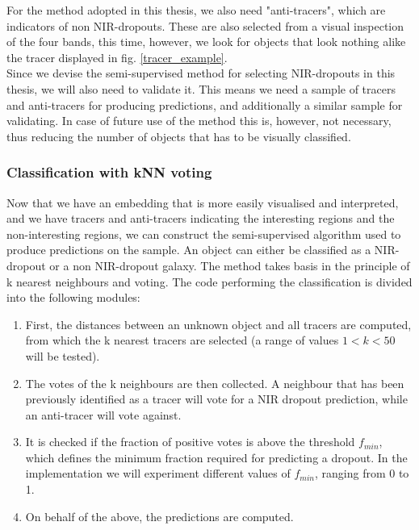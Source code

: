 For the method adopted in this thesis, we also need "anti-tracers", which are indicators of non NIR-dropouts. These are also selected from a visual inspection of the four bands, this time, however, we look for objects that look nothing alike the tracer displayed in fig. \ref{tracer_example}. \\ 
Since we devise the semi-supervised method for selecting NIR-dropouts in this thesis, we will also need to validate it. This means we need a sample of tracers and anti-tracers for producing predictions, and additionally a similar sample for validating. In case of future use of the method this is, however, not necessary, thus reducing the number of objects that has to be visually classified.

\subsubsection{Classification with kNN voting}
Now that we have an embedding that is more easily visualised and interpreted, and we have tracers and anti-tracers indicating the interesting regions and the non-interesting regions, we can construct the semi-supervised algorithm used to produce predictions on the sample. An object can either be classified as a NIR-dropout or a non NIR-dropout galaxy. The method takes basis in the principle of k nearest neighbours and voting. The code performing the classification is divided into the following modules:
\begin{enumerate}
    \item First, the distances between an unknown object and all tracers are computed, from which the k nearest tracers are selected (a range of values $1<k<50$ will be tested).
    \item The votes of the k neighbours are then collected. A neighbour that has been previously identified as a tracer will vote for a NIR dropout prediction, while an anti-tracer will vote against.
    \item It is checked if the fraction of positive votes is above the threshold $f_{min}$, which defines the minimum fraction required for predicting a dropout. In the implementation we will experiment different values of $f_{min}$, ranging from 0 to 1. 
    \item On behalf of the above, the predictions are computed.
\end{enumerate}
